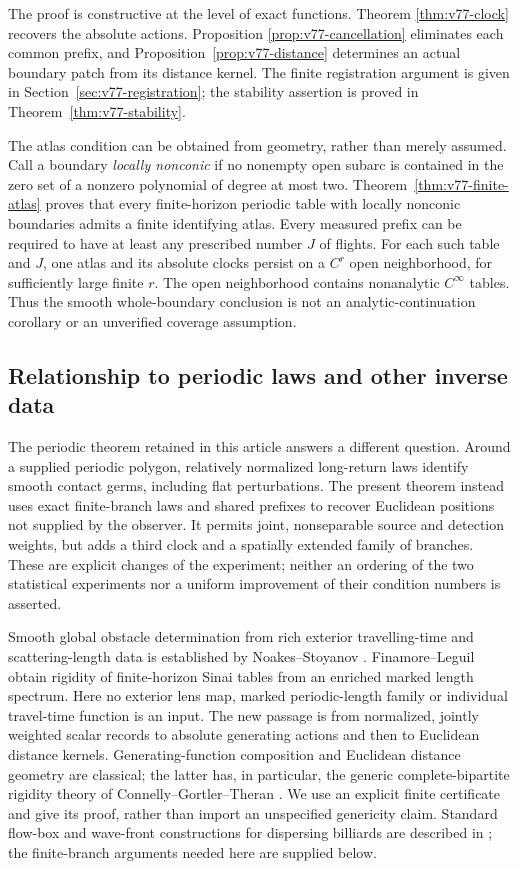 The proof is constructive at the level of exact functions.  Theorem
\ref{thm:v77-clock} recovers the absolute actions.  Proposition
\ref{prop:v77-cancellation} eliminates each common prefix, and
Proposition~\ref{prop:v77-distance} determines an actual boundary patch
from its distance kernel.  The finite registration argument is given in
Section~\ref{sec:v77-registration}; the stability assertion is proved
in Theorem~\ref{thm:v77-stability}.

The atlas condition can be obtained from geometry, rather than merely
assumed.  Call a boundary \emph{locally nonconic} if no nonempty open
subarc is contained in the zero set of a nonzero polynomial of degree at
most two.  Theorem~\ref{thm:v77-finite-atlas} proves that every
finite-horizon periodic table with locally nonconic boundaries admits a
finite identifying atlas.  Every measured prefix can be required to have
at least any prescribed number $J$ of flights.  For each such table and
$J$, one atlas and its absolute clocks persist on a $C^r$ open
neighborhood, for sufficiently large finite $r$.  The open neighborhood
contains nonanalytic $C^\infty$ tables.  Thus the smooth whole-boundary
conclusion is not an analytic-continuation corollary or an unverified
coverage assumption.

\subsection{Relationship to periodic laws and other inverse data}

The periodic theorem retained in this article answers a different
question.  Around a supplied periodic polygon, relatively normalized
long-return laws identify smooth contact germs, including flat
perturbations.  The present theorem instead uses exact finite-branch
laws and shared prefixes to recover Euclidean positions not supplied
by the observer.  It permits joint, nonseparable source and detection
weights, but adds a third clock and a spatially extended family of
branches.  These are explicit changes of the experiment; neither an
ordering of the two statistical experiments nor a uniform improvement
of their condition numbers is asserted.

Smooth global obstacle determination from rich exterior travelling-time
and scattering-length data is established by Noakes--Stoyanov
\cite{NoakesStoyanov2020}.  Finamore--Leguil
\cite{FinamoreLeguil} obtain rigidity of finite-horizon Sinai tables
from an enriched marked length spectrum.  Here no exterior lens map,
marked periodic-length family or individual travel-time function is an
input.  The new passage is from normalized, jointly weighted scalar
records to absolute generating actions and then to Euclidean distance
kernels.  Generating-function composition and Euclidean distance
geometry are classical; the latter has, in particular, the generic
complete-bipartite rigidity theory of Connelly--Gortler--Theran
\cite{V77ConnellyGortlerTheran}.  We use an explicit finite certificate
and give its proof, rather than import an unspecified genericity claim.
Standard flow-box and wave-front constructions for dispersing billiards
are described in \cite{V77ChernovMarkarian}; the
finite-branch arguments needed here are supplied below.

